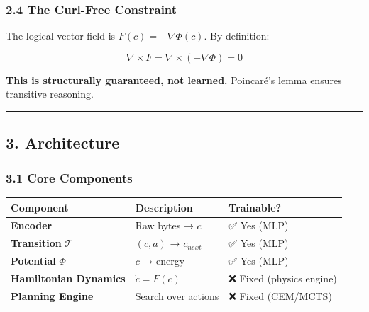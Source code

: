\documentclass[
  11pt,
  a4paper,
]{article}
\begin{document}
\subsubsection{2.4 The Curl-Free
Constraint}\label{the-curl-free-constraint}

The logical vector field is \(F(c) = -\nabla \Phi(c)\). By definition:

\[\nabla \times F = \nabla \times (-\nabla \Phi) = 0\]

\textbf{This is structurally guaranteed, not learned.} Poincaré's lemma
ensures transitive reasoning.

\begin{center}\rule{0.5\linewidth}{0.5pt}\end{center}

\subsection{3. Architecture}\label{architecture}

\subsubsection{3.1 Core Components}\label{core-components}

\begin{longtable}[]{@{}
  >{\raggedright\arraybackslash}p{}
  >{\raggedright\arraybackslash}p{}
  >{\raggedright\arraybackslash}p{}@{}}
\toprule\noalign{}
\begin{minipage}[b]{\linewidth}\raggedright
Component
\end{minipage} & \begin{minipage}[b]{\linewidth}\raggedright
Description
\end{minipage} & \begin{minipage}[b]{\linewidth}\raggedright
Trainable?
\end{minipage} \\
\midrule\noalign{}
\endhead
\bottomrule\noalign{}
\endlastfoot
\textbf{Encoder} & Raw bytes → \(c\) & ✅ Yes (MLP) \\
\textbf{Transition} \(\mathcal{T}\) & \((c, a)\) → \(c_{next}\) & ✅ Yes
(MLP) \\
\textbf{Potential} \(\Phi\) & \(c\) → energy & ✅ Yes (MLP) \\
\textbf{Hamiltonian Dynamics} & \(\dot{c} = F(c)\) & ❌ Fixed (physics
engine) \\
\textbf{Planning Engine} & Search over actions & ❌ Fixed (CEM/MCTS) \\
\end{longtable}
\end{document}
